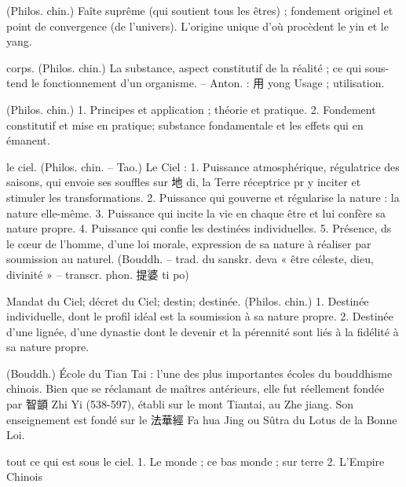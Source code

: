    
\begin{Def}[taiji 太極 ]
    (Philos. chin.) Faîte suprême (qui soutient tous les êtres) ; fondement originel et point de convergence (de l’univers). L’origine unique d’où procèdent le yin et le yang. 
\end{Def}
\begin{Def}[ti 體]
    corps. (Philos. chin.) La substance, aspect constitutif de la réalité ; ce qui sous-tend le fonctionnement d’un organisme. – Anton. : 用 yong Usage ; utilisation. 
\end{Def}
\begin{Def}[tiyong 體用]
  (Philos. chin.)	1. Principes et application ; théorie et pratique.	  2. Fondement constitutif et mise en pratique; substance fondamentale et les effets qui en émanent. 
\end{Def}
\begin{Def}[tian 天 ]
    le ciel. (Philos. chin. – Tao.) Le Ciel : 1. Puissance atmosphérique, régulatrice des saisons, qui envoie ses souffles sur 地 di, la Terre réceptrice pr y inciter et stimuler les transformations. 2. Puissance qui gouverne et régularise la nature : la nature elle-même. 3. Puissance qui incite la vie en chaque être et lui confère sa nature propre. 4. Puissance qui confie les destinées individuelles. 5. Présence, ds le cœur de l’homme, d’une loi morale, expression de sa nature à réaliser par soumission au naturel. (Bouddh. – trad. du sanskr. deva « être céleste, dieu, divinité » – transcr. phon. 提婆 ti po) 
\end{Def}
\begin{Def}[tianming 天命]
    Mandat du Ciel; décret du Ciel; destin; destinée.	(Philos. chin.) 1. Destinée individuelle, dont le profil idéal est la soumission à sa nature propre. 2. Destinée d’une lignée, d’une dynastie dont le devenir et la pérennité sont liés à la fidélité à sa nature propre. 
\end{Def}
\begin{Def}
    (Bouddh.) École du Tian Tai : l’une des plus importantes écoles du bouddhisme chinois. Bien que se réclamant de maîtres antérieurs, elle fut réellement fondée par 智顗 Zhi Yi (538-597), établi sur le mont Tiantai, au Zhe jiang. Son enseignement est fondé sur le 法華經 Fa hua Jing ou Sûtra du Lotus de la Bonne Loi. 
\end{Def}
\begin{Def}[tianxia 天下]
    tout ce qui est sous le ciel. 1. Le monde ; ce bas monde ; sur terre 2. L’Empire Chinois
\end{Def}
